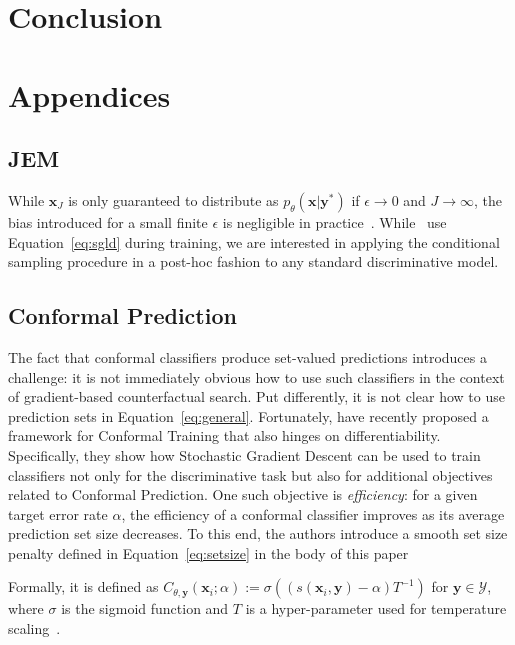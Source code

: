 \documentclass{article}
\begin{document}
\section{Conclusion}

\medskip



\appendix
\section*{Appendices}
\renewcommand{\thesubsection}{\Alph{subsection}}

\subsection{JEM}\label{app-jem}

While $\mathbf{x}_J$ is only guaranteed to distribute as $p_{\theta}(\mathbf{x}|\mathbf{y}^*)$ if $\epsilon \rightarrow 0$ and $J \rightarrow \infty$, the bias introduced for a small finite $\epsilon$ is negligible in practice~\citep{murphy2023probabilistic,grathwohl2020your}. While~\citet{grathwohl2020your} use Equation~\ref{eq:sgld} during training, we are interested in applying the conditional sampling procedure in a post-hoc fashion to any standard discriminative model. 

\subsection{Conformal Prediction}\label{app-cp}

The fact that conformal classifiers produce set-valued predictions introduces a challenge: it is not immediately obvious how to use such classifiers in the context of gradient-based counterfactual search. Put differently, it is not clear how to use prediction sets in Equation~\ref{eq:general}. Fortunately, \citet{stutz2022learning} have recently proposed a framework for Conformal Training that also hinges on differentiability. Specifically, they show how Stochastic Gradient Descent can be used to train classifiers not only for the discriminative task but also for additional objectives related to Conformal Prediction. One such objective is \textit{efficiency}: for a given target error rate $\alpha$, the efficiency of a conformal classifier improves as its average prediction set size decreases. To this end, the authors introduce a smooth set size penalty defined in Equation~\ref{eq:setsize} in the body of this paper

Formally, it is defined as $C_{\theta,\mathbf{y}}(\mathbf{x}_i;\alpha):=\sigma\left((s(\mathbf{x}_i,\mathbf{y})-\alpha) T^{-1}\right)$ for $\mathbf{y}\in\mathcal{Y}$, where $\sigma$ is the sigmoid function and $T$ is a hyper-parameter used for temperature scaling~\citep{stutz2022learning}.
\end{document}
